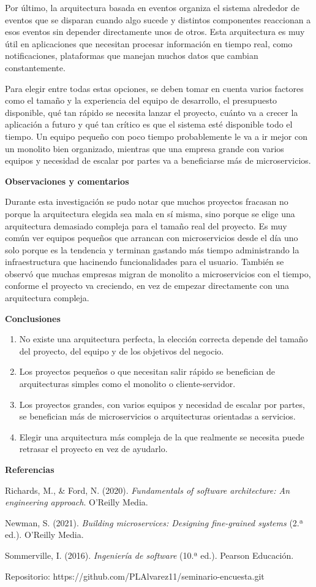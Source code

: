 \documentclass[12pt,letterpaper]{article}
\begin{document}
Por último, la arquitectura basada en eventos organiza el sistema alrededor de eventos que se disparan cuando algo sucede y distintos componentes reaccionan a esos eventos sin depender directamente unos de otros. Esta arquitectura es muy útil en aplicaciones que necesitan procesar información en tiempo real, como notificaciones, plataformas que manejan muchos datos que cambian constantemente.

Para elegir entre todas estas opciones, se deben tomar en cuenta varios factores como el tamaño y la experiencia del equipo de desarrollo, el presupuesto disponible, qué tan rápido se necesita lanzar el proyecto, cuánto va a crecer la aplicación a futuro y qué tan crítico es que el sistema esté disponible todo el tiempo. Un equipo pequeño con poco tiempo probablemente le va a ir mejor con un monolito bien organizado, mientras que una empresa grande con varios equipos y necesidad de escalar por partes va a beneficiarse más de microservicios.

\textbf{Observaciones y comentarios}

Durante esta investigación se pudo notar que muchos proyectos fracasan no porque la arquitectura elegida sea mala en sí misma, sino porque se elige una arquitectura demasiado compleja para el tamaño real del proyecto. Es muy común ver equipos pequeños que arrancan con microservicios desde el día uno solo porque es la tendencia y terminan gastando más tiempo administrando la infraestructura que hacinendo funcionalidades para el usuario. También se observó que muchas empresas migran de monolito a microservicios con el tiempo, conforme el proyecto va creciendo, en vez de empezar directamente con una arquitectura compleja. 

\textbf{Conclusiones}

\begin{enumerate}[label=\arabic*.]
\item No existe una arquitectura perfecta, la elección correcta depende del tamaño del proyecto, del equipo y de los objetivos del negocio.
\item Los proyectos pequeños o que necesitan salir rápido se benefician de arquitecturas simples como el monolito o cliente-servidor.
\item Los proyectos grandes, con varios equipos y necesidad de escalar por partes, se benefician más de microservicios o arquitecturas orientadas a servicios.
\item Elegir una arquitectura más compleja de la que realmente se necesita puede retrasar el proyecto en vez de ayudarlo.
\end{enumerate}

\textbf{Referencias}

Richards, M., \& Ford, N. (2020). \textit{Fundamentals of software architecture: An engineering approach}. O'Reilly Media.

Newman, S. (2021). \textit{Building microservices: Designing fine-grained systems} (2.ª ed.). O'Reilly Media.

Sommerville, I. (2016). \textit{Ingeniería de software} (10.ª ed.). Pearson Educación.

\vspace{0.5cm}
\noindent \small Repositorio: https://github.com/PLAlvarez11/seminario-encuesta.git
\end{document}
